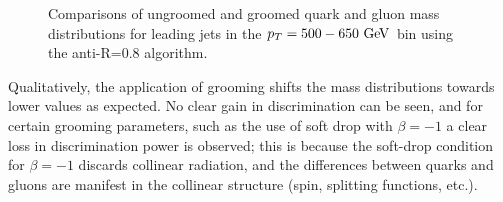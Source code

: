 \begin{figure}
\begin{center}
\caption{Comparisons of ungroomed and groomed quark and gluon mass distributions for leading jets in the 
$\pt=500-650 \GeV$ bin using the anti-\kT R=0.8 algorithm. }
\label{fig:qg_pt500_mass_AKt_R08}
\end{center}
\end{figure}
Qualitatively, the application of grooming shifts the mass distributions towards
lower values as expected. No clear gain in discrimination can be seen, and for
certain grooming parameters, such as the use of soft drop with $\beta=-1$ a clear
loss in discrimination power is observed; this is because the soft-drop condition for $\beta=-1$ discards collinear radiation, and the differences between quarks and gluons are manifest in the collinear structure (spin, splitting functions, etc.). 


